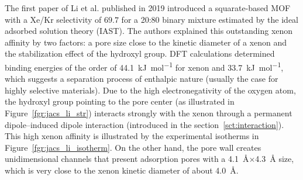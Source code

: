 \documentclass[main]{subfiles}
\begin{document}
The first paper of Li et al.\autocite{Li_2019} published in 2019 introduced a squarate-based MOF with a Xe/Kr selectivity of $69.7$ for a 20:80 binary mixture estimated by the ideal adsorbed solution theory (IAST)\autocite{Cessford_2012}. The authors explained this outstanding xenon affinity by two factors: a pore size close to the kinetic diameter of a xenon and the stabilization effect of the hydroxyl group. DFT calculations determined binding energies of the order of \SI{44.1}{\kJ\per\mole} for xenon and \SI{33.7}{\kJ\per\mole}, which suggests a separation process of enthalpic nature (usually the case for highly selective materials). Due to the high electronegativity of the oxygen atom, the hydroxyl group pointing to the pore center (as illustrated in Figure~\ref{fgr:jacs_li_str}) interacts strongly with the xenon through a permanent dipole--induced dipole interaction (introduced in the section~\ref{sct:interaction}). This high xenon affinity is illustrated by the experimental isotherms in Figure~\ref{fgr:jacs_li_isotherm}. On the other hand, the pore wall creates unidimensional channels that present adsorption pores with a \SI{4.1}{\angstrom}$\times$\SI{4.3}{\angstrom} size, which is very close to the xenon kinetic diameter of about \SI{4.0}{\angstrom}. 
\end{document}

